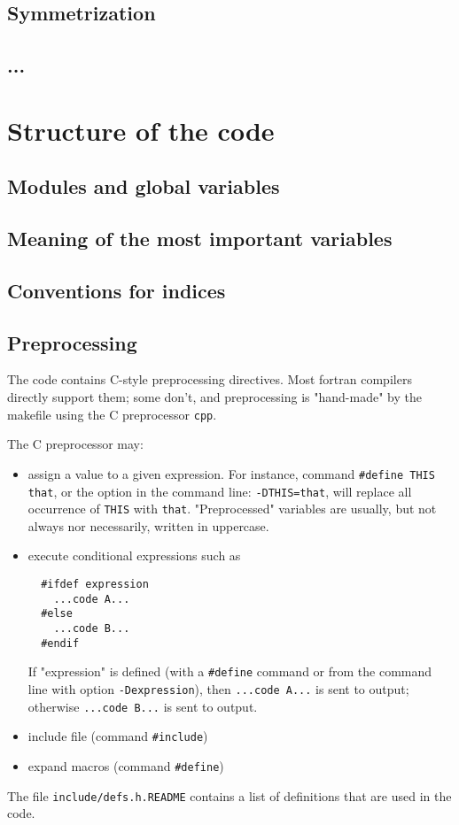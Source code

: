 \documentclass[12pt,a4paper]{article}
\begin{document}
\subsection{Symmetrization}

\subsection{...}

\section{Structure of the code}

\subsection{Modules and global variables}

\subsection{Meaning of the most important variables}

\subsection{Conventions for indices}

\subsection{Preprocessing}

\label{preproc}
The code contains C-style preprocessing directives. Most
fortran compilers directly support them; some don't, and
preprocessing is "hand-made" by the makefile using the C
preprocessor {\tt cpp}.

The C preprocessor may:
\begin{itemize}
  \item
    assign a value to a given expression. For instance, command
    \texttt{\#define THIS that}, or the option in the command line:
    \texttt{-DTHIS=that}, will replace all occurrence of \texttt{THIS}
    with \texttt{that}.
    "Preprocessed" variables are usually, but not always nor 
    necessarily,  written in uppercase.
  \item
    execute conditional expressions such as
\begin{verbatim}
  #ifdef expression
    ...code A...
  #else
    ...code B...
  #endif
\end{verbatim}
    If "expression" is defined (with a \texttt{\#define} command or
    from the command line with option \texttt{-Dexpression}), then
    \texttt{...code A...} is sent to output; otherwise
    \texttt{...code B...} is sent to output.
  \item
    include file (command \texttt{\#include})
  \item
    expand macros (command \texttt{\#define})
\end{itemize}
The file \texttt{include/defs.h.README} contains a list of definitions
that are used in the code.
\end{document}
